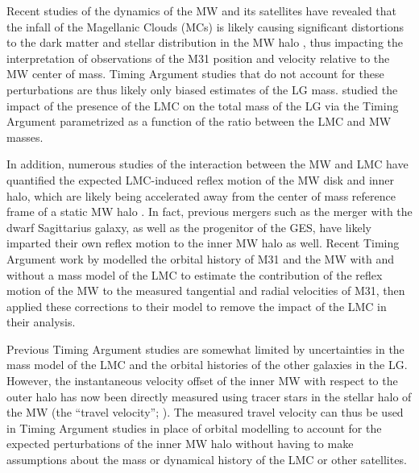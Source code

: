 \documentclass[twocolumn]{aastex631}
\begin{document}
Recent studies of the dynamics of the MW and its satellites have
revealed that the infall of the Magellanic Clouds (MCs) is likely causing
significant distortions to the dark matter and stellar distribution in the MW
halo \citep{Laporte:2018a, Laporte:2018b, Garavito-Camargo:2019, Conroy:2021,
Erkal:2021}, thus impacting the interpretation of observations of the M31
position and velocity relative to the MW center of mass.
Timing Argument studies that do not account for these perturbations are thus 
likely only biased estimates of the LG mass.
\citet{Penarrubia2016} studied the impact of the presence of the LMC on the 
total mass of the LG via the Timing Argument parametrized as a function of the 
ratio between the LMC and MW masses. 

In addition, numerous studies of the interaction between the MW and LMC have 
quantified the expected LMC-induced reflex motion of the MW disk and inner halo,
which are likely being accelerated away from the center of mass reference frame 
of a static MW halo 
\citep{Gomez2015, Cunningham:2020, Petersen:2020, Garavito-Camargo2021b}.
In fact, previous mergers such as the merger with the dwarf Sagittarius galaxy, 
as well as the progenitor of the GES, have likely imparted their own reflex 
motion to the inner MW halo as well. 
Recent Timing Argument work by \cite{Benisty2022} modelled the orbital history
of M31 and the MW with and without a mass model of the LMC to estimate the
contribution of the reflex motion of the MW to the measured tangential and
radial velocities of M31, then applied these corrections to their model to 
remove the impact of the LMC in their analysis. 

Previous Timing Argument studies are somewhat limited by uncertainties in the 
mass model of the LMC and the orbital histories of the other galaxies in 
the LG. 
However, the instantaneous velocity offset of the inner MW with respect to the
outer halo has now been directly measured using tracer stars in the stellar halo
of the MW (the ``travel velocity''; \citealt{Petersen2021}). 
The measured travel velocity can thus be used in Timing Argument studies in 
place of orbital modelling to account for the expected perturbations of the 
inner MW halo without having to make assumptions about the mass or dynamical 
history of the LMC or other satellites. 
\end{document}

